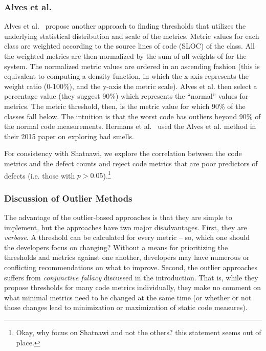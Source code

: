 \documentclass[twocolumn,5p]{elsarticle}
\theoremstyle{break}
\begin{document}
	
	\subsubsection{ Alves et al.}
	Alves et al.~\cite{Alves2010} propose another approach 
	to finding thresholds that  utilizes the underlying statistical distribution and scale of the metrics. 
	Metric values for each class are weighted according to the source lines of code (SLOC) of the class. All the weighted metrics are then normalized by the sum of all weights of for the system. 
	The normalized metric values are ordered in an ascending fashion (this is equivalent to computing a density function, in which the x-axis represents the weight ratio (0-100\%), and the y-axis the metric scale).
	Alves et al. then select a percentage value (they suggest 90\%) which represents the ``normal'' values for metrics. The metric threshold, then, is the metric value for which 90\% of the classes fall below. The intuition  is that the worst code has outliers beyond 90\% of the normal code measurements. Hermans et al.~\cite{hermans15} used the
	Alves et al. method in their  2015 paper on
	exploring bad smells.
	
	For consistency with Shatnawi, we explore the correlation between the code metrics and the defect counts and  reject code metrics that are poor predictors of defects (i.e.   those  with $p > 0.05$).\footnote{Okay, why focus on Shatnawi and not the others? this statement seems out of place.}
	
	\subsubsection{Discussion of Outlier Methods}\label{sect:disc}
	The advantage of the outlier-based
	approaches is that they are simple to implement, but the approaches have   two  major disadvantages. 
	First, they are {\em verbose}. A threshold can be calculated for every metric -- so, which one should the developers focus on changing? Without a means for prioritizing the  thresholds and metrics against one another, developers may have numerous or conflicting recommendations on what to improve. Second, the outlier approaches suffers from {\em conjunctive fallacy}  discussed in the introduction. That is, while	they propose thresholds for many code metrics
	individually, they make no comment on what minimal metrics need to be changed at the same time (or whether or not those changes lead to minimization or maximization of static code measures).
	
\end{document}
